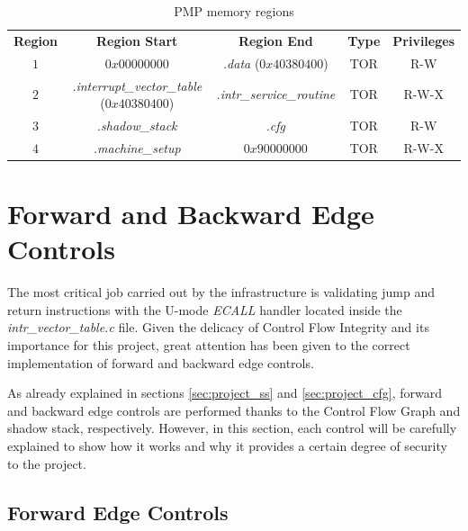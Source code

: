 \begin{table}
  \centering
  \begin{tabular}{|c|c|c|c|c|}
    \hline
    \textbf{Region}    & \textbf{Region Start}                             & \textbf{Region End}              & \textbf{Type} & \textbf{Privileges} \\
    \hhline{=====} $1$ & $0x00000000$                                      & \textit{.data} ($0x40380400$)    & TOR           & R-W                 \\
    \hline
    $2$                & \textit{.interrupt\_vector\_table} ($0x40380400$) & \textit{.intr\_service\_routine} & TOR           & R-W-X               \\
    \hline
    $3$                & \textit{.shadow\_stack}                           & \textit{.cfg}                    & TOR           & R-W                 \\
    \hline
    $4$                & \textit{.machine\_setup}                          & $0x90000000$                     & TOR           & R-W-X               \\
    \hline
  \end{tabular}
  \caption{PMP memory regions}
  \label{tab:pmpregions}
\end{table}

\section{Forward and Backward Edge Controls}
\label{sec:project_controls}

The most critical job carried out by the infrastructure is validating jump and
return instructions with the U-mode \textit{ECALL} handler located inside the \textit{intr\_vector\_table.c}
file. Given the delicacy of Control Flow Integrity and its importance for this project,
great attention has been given to the correct implementation of forward and
backward edge controls.

As already explained in sections \ref{sec:project_ss} and \ref{sec:project_cfg},
forward and backward edge controls are performed thanks to the Control Flow Graph
and shadow stack, respectively. However, in this section, each control will be carefully
explained to show how it works and why it provides a certain degree of security to
the project.

\subsection{Forward Edge Controls}
\label{subsec:forward}

